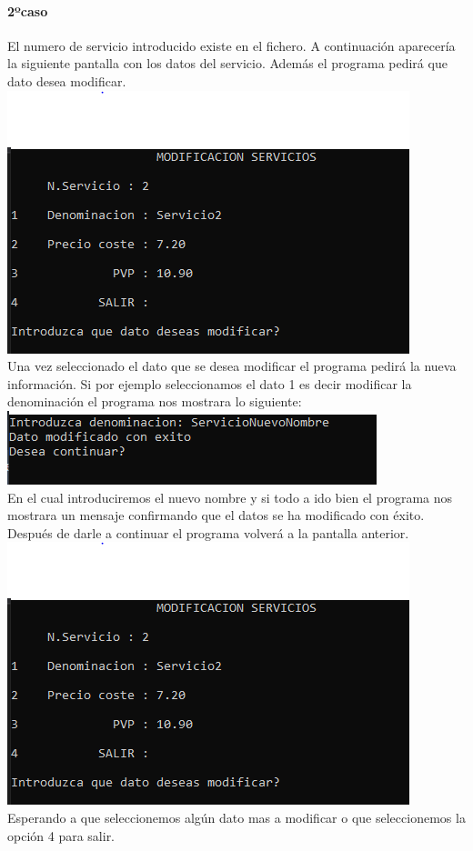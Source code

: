 \documentclass[12pt]{article}
\begin{document}
    \paragraph{2ºcaso}
        El numero de servicio introducido existe en el fichero. A continuación aparecería la siguiente pantalla con los datos del servicio. Además el programa pedirá que dato desea modificar.\\
        \includegraphics[]{ModificacionServicio.PNG}\\
        Una vez seleccionado el dato que se desea modificar el programa pedirá la nueva información. Si por ejemplo seleccionamos el dato 1 es decir modificar la denominación el  programa nos mostrara lo siguiente:\\
        \includegraphics[]{ModificacionServicioIntroducirDenominacion.PNG}\\
        En el cual introduciremos el nuevo nombre y si todo a ido bien el programa nos mostrara un mensaje confirmando que el datos se ha modificado con éxito.\\
        Después de darle a continuar el programa volverá a la pantalla anterior.\\
        \includegraphics[]{ModificacionServicio.PNG}\\
        Esperando a que seleccionemos algún dato mas a modificar o que seleccionemos la opción 4 para salir.
        
\end{document}
